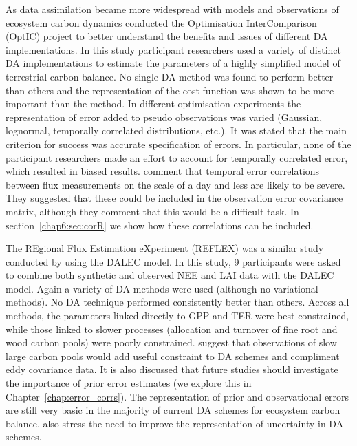 As data assimilation became more widespread with models and observations of ecosystem carbon dynamics \citet{trudinger2007optic} conducted the Optimisation InterComparison (OptIC) project to better understand the benefits and issues of different DA implementations. In this study participant researchers used a variety of distinct DA implementations to estimate the parameters of a highly simplified model of terrestrial carbon balance. No single DA method was found to perform better than others and the representation of the cost function was shown to be more important than the method. In different optimisation experiments the representation of error added to pseudo observations was varied (Gaussian, lognormal, temporally correlated distributions, etc.). It was stated that the main criterion for success was accurate specification of errors. In particular, none of the participant researchers made an effort to account for temporally correlated error, which resulted in biased results. \citet{williams2009improving} comment that temporal error correlations between flux measurements on the scale of a day and less are likely to be severe. They suggested that these could be included in the observation error covariance matrix, although they comment that this would be a difficult task. In section~\ref{chap6:sec:corR} we show how these correlations can be included.  

The REgional Flux Estimation eXperiment (REFLEX) was a similar study conducted by \citet{fox2009reflex} using the DALEC model. In this study, 9 participants were asked to combine both synthetic and observed NEE and LAI data with the DALEC model. Again a variety of DA methods were used (although no variational methods). No DA technique performed consistently better than others. Across all methods, the parameters linked directly to GPP and TER were best constrained, while those linked to slower processes (allocation and turnover of fine root and wood carbon pools) were poorly constrained. \citet{fox2009reflex} suggest that observations of slow large carbon pools would add useful constraint to DA schemes and compliment eddy covariance data. It is also discussed that future studies should investigate the importance of prior error estimates (we explore this in Chapter~\ref{chap:error_corrs}). The representation of prior and observational errors are still very basic in the majority of current DA schemes for ecosystem carbon balance. \citet{Dietze2013} also stress the need to improve the representation of uncertainty in DA schemes. 

